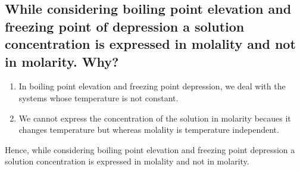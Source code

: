 \documentclass{article}
\begin{document}
   \subsection{While considering boiling point elevation and freezing
   point of depression a solution concentration is expressed in 
   molality and not in molarity. Why?}
   \begin{enumerate}
	\item In boiling point elevation and freezing point depression,
	we deal with the systems whose temperature is not constant.
	\item We cannot express the concentration of the solution in
	molarity becaues it changes temperature but whereas molality
	is temperature independent.
   \end{enumerate}
   Hence, while considering boiling point elevation and freezing point
   depression a solution concentration is expressed in molality and
   not in molarity.
\end{document}
